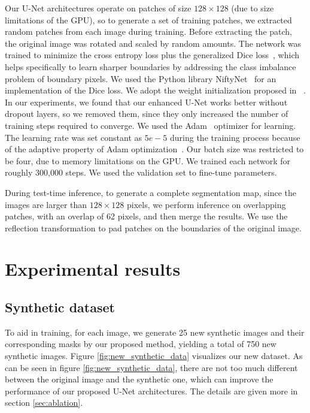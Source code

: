 Our U-Net architectures operate on patches of size $128 \times 128$ (due to size limitations of the GPU), so to generate a set of training patches, we extracted random patches from each image during training.
Before extracting the patch, the original image was rotated and scaled by random amounts.
The network was trained to minimize the cross entropy loss plus the generalized Dice loss~\cite{sudre2017generalised}, which helps specifically to learn sharper boundaries by addressing the class imbalance problem of boundary pixels.
We used the Python library NiftyNet~\cite{Gibson2018} for an implementation of the Dice loss.
We adopt the weight initialization proposed in ~\cite{DBLP:journals/corr/HeZR015}.
In our experiments, we found that our enhanced U-Net works better without dropout layers, so we removed them, since they only increased the number of training steps required to converge.
We used the Adam~\cite{DBLP:journals/corr/KingmaB14} optimizer for learning.
The learning rate was set constant as $5e-5$ during the training process because of the adaptive property of Adam optimization~\cite{DBLP:journals/corr/KingmaB14}.
Our batch size was restricted to be four, due to memory limitations on the GPU.
We trained each network for roughly 300,000 steps. 
We used the validation set to fine-tune parameters.

During test-time inference, to generate a complete segmentation map, since the images are larger than $128 \times 128$ pixels, we perform inference on overlapping patches, with an overlap of 62 pixels, and then merge the results.
We use the reflection transformation to pad patches on the boundaries of the original image.

\section{Experimental results}

\subsection{Synthetic dataset}
To aid in training, for each image, we generate 25 new synthetic images and their corresponding masks by our proposed method, yielding a total of 750 new synthetic images. Figure \ref{fig:new_synthetic_data} visualizes our new dataset. As can be seen in figure \ref{fig:new_synthetic_data}, there are not too much different between the original image and the synthetic one, which can improve the performance of our proposed U-Net architectures. The details are given more in section \ref{sec:ablation}.

